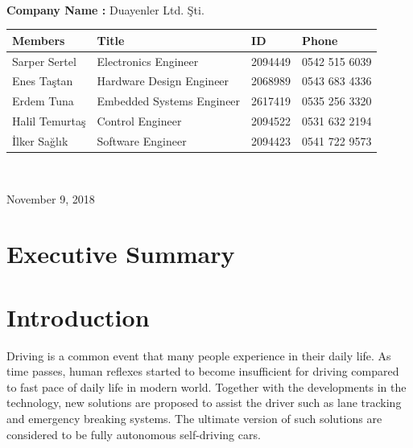 \documentclass[a4paper,12pt]{article}
\begin{document}
\begin{titlepage}
\begin{minipage}[r]{0.35\textwidth}
\end{minipage}\\[1cm]
\begin{minipage}{\textwidth}
	\begin{flushleft}
		\large{\textbf{Company Name :}}	Duayenler Ltd. Şti.\\
		\begin{table}[H]
			\begin{tabular}{l l l l}
				\hline
				\textbf{Members}&\textbf{Title}& \textbf{ID}&\textbf{Phone} \\ \hline
				Sarper Sertel & Electronics Engineer& 2094449 & 0542 515 6039  \\ 
				Enes Taştan & Hardware Design Engineer & 2068989 & 0543 683 4336  \\ 
				Erdem Tuna & Embedded Systems Engineer& 2617419 & 0535 256 3320  \\ 
				Halil Temurtaş & Control Engineer& 2094522 & 0531 632 2194  \\
				İlker Sağlık & Software Engineer& 2094423 & 0541 722 9573  \\ \hline
				
				
			\end{tabular}
		\end{table}
	\end{flushleft}
\end{minipage}\\[1cm]

\begin{flushbottom}
{\large November 9, 2018} %
\end{flushbottom}

\end{titlepage}

\blankpage
\tableofcontents
\newpage



\section{Executive Summary}


\section{Introduction}

Driving is a common event that many people experience in their daily life. As time passes, human reflexes started to become insufficient for driving compared to fast pace of daily life in modern world. Together with the developments in the technology, new solutions are proposed to assist the driver such as lane tracking and emergency breaking systems. The ultimate version of such solutions are considered to be fully autonomous self-driving cars. \\
\end{document}
